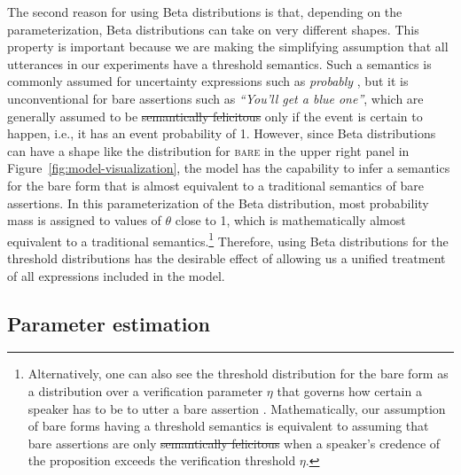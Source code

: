 \documentclass[man, floatsintext]{apa6}
\providecommand{\DIFadd}[1]{{\protect\color{blue}\uwave{#1}}} %
\providecommand{\DIFdel}[1]{{\protect\color{red}\sout{#1}}}                      %
\providecommand{\DIFaddbegin}{} %
\providecommand{\DIFaddend}{} %
\providecommand{\DIFdelbegin}{} %
\providecommand{\DIFdelend}{} %
\newcommand{\DIFscaledelfig}{0.5}
\newlength{\DIFdelgraphicswidth} %
\newlength{\DIFdelgraphicsheight} %
\newcommand{\DIFaddincludegraphics}[2][]{{\color{blue}\fbox{\DIFOincludegraphics[#1]{#2}}}} %
\newcommand{\DIFdelincludegraphics}[2][]{%
\sbox{\DIFdelgraphicsbox}{\DIFOincludegraphics[#1]{#2}}%
\settoboxwidth{\DIFdelgraphicswidth}{\DIFdelgraphicsbox} %
\settoboxtotalheight{\DIFdelgraphicsheight}{\DIFdelgraphicsbox} %
\scalebox{\DIFscaledelfig}{%
\parbox[b]{\DIFdelgraphicswidth}{\usebox{\DIFdelgraphicsbox}\\[-\baselineskip] \rule{\DIFdelgraphicswidth}{0em}}\llap{\resizebox{\DIFdelgraphicswidth}{\DIFdelgraphicsheight}{%
\setlength{\unitlength}{\DIFdelgraphicswidth}%
\begin{picture}(1,1)%
\thicklines\linethickness{2pt} %
{\color[rgb]{1,0,0}\put(0,0){\framebox(1,1){}}}%
{\color[rgb]{1,0,0}\put(0,0){\line( 1,1){1}}}%
{\color[rgb]{1,0,0}\put(0,1){\line(1,-1){1}}}%
\end{picture}%
}\hspace*{3pt}}} %
} %
\DeclareRobustCommand{\DIFaddbegin}{\DIFOaddbegin \let\includegraphics\DIFaddincludegraphics} %
\DeclareRobustCommand{\DIFaddend}{\DIFOaddend \let\includegraphics\DIFOincludegraphics} %
\DeclareRobustCommand{\DIFdelbegin}{\DIFOdelbegin \let\includegraphics\DIFdelincludegraphics} %
\DeclareRobustCommand{\DIFdelend}{\DIFOaddend \let\includegraphics\DIFOincludegraphics} %
\begin{document}
The second reason for using Beta distributions is that, depending on the parameterization, 
Beta distributions can take on very different shapes. This property is important because we are making
the simplifying assumption that all utterances in our experiments have a threshold semantics.
Such a semantics is commonly assumed for uncertainty expressions such as \textit{probably} \parencite[e.g.,][]{Yalcin2010,Lassiter2016}, 
but it is unconventional for bare assertions such as \textit{``You'll get a blue one''}, which are generally assumed to be  
\DIFdelbegin \DIFdel{semantically felicitous }\DIFdelend \DIFaddbegin \DIFadd{true }\DIFaddend only if the event is certain to happen, i.e., it has an event probability of 1. However, since Beta distributions can have a shape 
like the distribution for \textsc{bare} in the upper right panel in Figure~\ref{fig:model-visualization}, the model has the capability to infer
a semantics for the bare form that is almost equivalent to a traditional semantics of bare assertions. In this parameterization of the
Beta distribution, most probability mass is assigned to values of $\theta$ close to 1, which is mathematically almost equivalent to
a traditional semantics.\footnote{Alternatively, one can also see the threshold distribution for the bare form as a distribution over a verification parameter $\eta$ that governs 
how certain a speaker has to be to utter a bare assertion \parencite[see, e.g.,][]{Moss2018}. Mathematically, our assumption of bare forms having a threshold
semantics is equivalent to assuming that bare assertions are only \DIFdelbegin \DIFdel{semantically felicitous }\DIFdelend \DIFaddbegin \DIFadd{true }\DIFaddend when a speaker's credence of the proposition exceeds the verification threshold $\eta$.}
Therefore, using Beta distributions for the threshold distributions has the desirable effect of allowing us a unified treatment of all expressions included in the model. 

\subsection{Parameter estimation}
\end{document}
